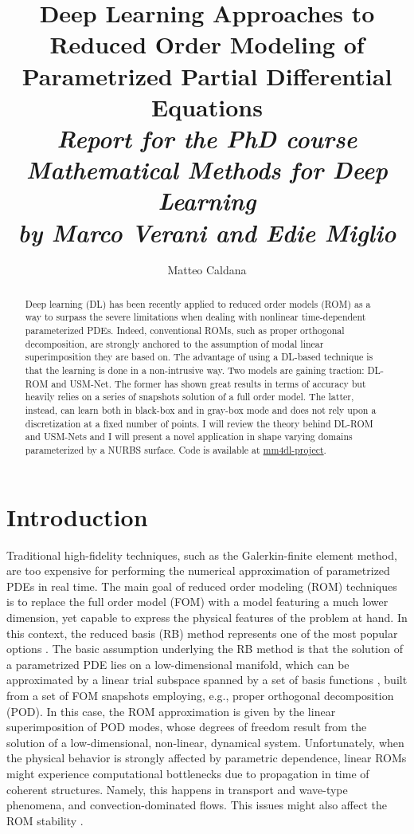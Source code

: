 \documentclass[11pt]{article}
\title{Deep Learning Approaches to Reduced Order Modeling of Parametrized Partial Differential Equations\\ \vspace{0.5em} \textit{\normalsize Report for the PhD course Mathematical Methods for Deep Learning\\ \vspace{-0.7em}  by Marco Verani and Edie Miglio}}
\author{Matteo Caldana}
\begin{document}
\maketitle

\begin{abstract}
Deep learning (DL) has been recently applied to reduced order models (ROM) as a way to surpass the severe limitations when dealing with nonlinear time-dependent parameterized PDEs. Indeed, conventional ROMs, such as proper orthogonal decomposition, are strongly anchored to the assumption of modal linear superimposition they are based on. The advantage of using a DL-based technique is that the learning is done in a non-intrusive way. Two models are gaining traction: DL-ROM and USM-Net. The former has shown great results in terms of accuracy but heavily relies on a series of snapshots solution of a full order model. The latter, instead, can learn both in black-box and in gray-box mode and does not rely upon a discretization at a fixed number of points. I will review the theory behind DL-ROM and USM-Nets and I will present a novel application in shape varying domains  parameterized by a NURBS surface. Code is available at \href{https://github.com/MatteoCaldana/mm4dl-project}{mm4dl-project}.
\end{abstract}


\section*{Introduction}
Traditional high-fidelity techniques, such as the Galerkin-finite element method, are too expensive for performing the numerical approximation of parametrized PDEs in real time. The main goal of reduced order modeling (ROM) techniques is to replace the full order model (FOM) with a model featuring a much lower dimension, yet capable to express the physical features of the problem at hand. In this context, the reduced basis (RB) method represents one of the most popular options \cite{quarteroni2015reduced}. The basic assumption underlying the RB method is that the solution of a parametrized PDE lies on a low-dimensional manifold, which can be approximated by a linear trial subspace spanned by a set of basis functions \cite{benner2017model}, built from a set of FOM snapshots employing, e.g., proper orthogonal decomposition (POD). In this case, the ROM approximation is given by the linear superimposition of POD modes, whose degrees of freedom result from the solution of a low-dimensional, non-linear, dynamical system. Unfortunately, when the physical
behavior is strongly affected by parametric dependence, linear ROMs might experience computational bottlenecks due to propagation in time of coherent structures. Namely, this happens in
transport and wave-type phenomena, and convection-dominated flows. This issues might also affect the ROM stability \cite{ballarin2015supremizer}.\\
\end{document}
